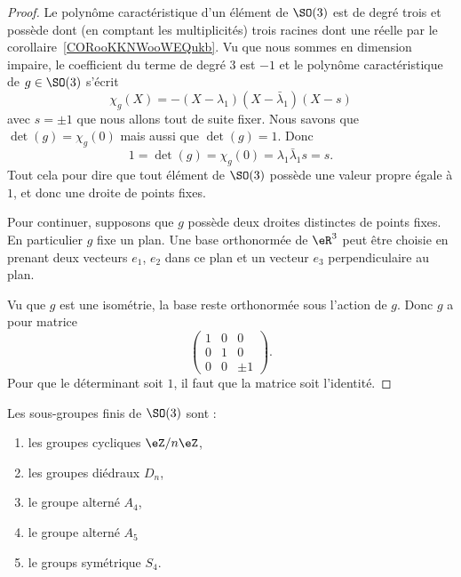 \begin{proof}
    Le polynôme caractéristique d'un élément de \( \SO(3)\) est de degré trois et possède dont (en comptant les multiplicités) trois racines dont une réelle par le corollaire~\ref{CORooKKNWooWEQukb}. Vu que nous sommes en dimension impaire, le coefficient du terme de degré \( 3\) est \( -1\) et le polynôme caractéristique de \( g\in\SO(3)\) s'écrit
    \begin{equation}
        \chi_g(X)=-(X-\lambda_1)(X-\bar\lambda_1)(X-s)
    \end{equation}
    avec \( s=\pm1 \) que nous allons tout de suite fixer. Nous savons que \( \det(g)=\chi_g(0)\) mais aussi que \( \det(g)=1\). Donc
    \begin{equation}
        1=\det(g)=\chi_g(0)=\lambda_1\bar\lambda_1 s=s.
    \end{equation}
    Tout cela pour dire que tout élément de \( \SO(3)\) possède une valeur propre égale à \( 1\), et donc une droite de points fixes.

    Pour continuer, supposons que \( g\) possède deux droites distinctes de points fixes. En particulier \( g\) fixe un plan. Une base orthonormée de \( \eR^3\) peut être choisie en prenant deux vecteurs \( e_1\), \( e_2\) dans ce plan et un vecteur \( e_3\) perpendiculaire au plan.

    Vu que \( g\) est une isométrie, la base reste orthonormée sous l'action de \( g\). Donc \( g\) a pour matrice
    \begin{equation}
        \begin{pmatrix}
            1    &   0    &   0    \\
            0    &   1    &   0    \\
            0    &   0    &   \pm 1
        \end{pmatrix}.
    \end{equation}
    Pour que le déterminant soit \( 1\), il faut que la matrice soit l'identité.
\end{proof}

\begin{proposition}      \label{PROPooBHPNooHPlgwH}
    Les sous-groupes finis de \( \SO(3)\) sont :
    \begin{multicols}{2}
        \begin{enumerate}
            \item
                les groupes cycliques \( \eZ/n\eZ\),
            \item
                les groupes diédraux \( D_n\),
            \item
                le groupe alterné \( A_4\),
            \item
                le groupe alterné \( A_5\)
            \item
                le groups symétrique \( S_4\).
        \end{enumerate}
    \end{multicols}
\end{proposition}

